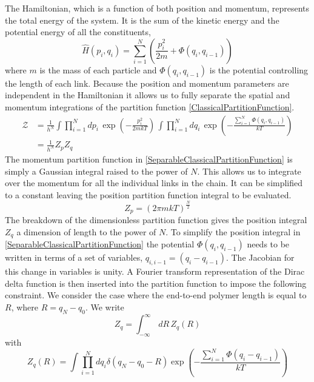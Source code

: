 The Hamiltonian, which is a function of both position and momentum, represents the total energy of the system. It is the sum of the kinetic energy and the potential energy of all the constituents,
%
\begin{equation}
\widehat{H}\left(p_{i},q_{i}\right)=\sum_{i=1}^{N}\left(\frac{p_{i}^{2}}{2m}+\Phi\left(q_{i},q_{i-1}\right)\right)\label{Hamiltonian}
\end{equation}
%
where $m$ is the mass of each particle and $\Phi\left(q_{i},q_{i-1}\right)$ is the potential controlling the length of each link. Because the position and momentum parameters are independent in the Hamiltonian it allows us to fully separate the spatial and momentum integrations of the partition function \eqref{ClassicalPartitionFunction}.
%
\begin{align}
\mathcal{Z} & =\frac{1}{h^{N}}\int\prod_{i=1}^{N}dp_{i}\,\exp\left(-\frac{p_{i}^{2}}{2mkT}\right)\,\int\prod_{i=1}^{N}dq_{i}\,\exp\left(-\frac{\sum_{i=1}^{N}\Phi\left(q_{i},q_{i-1}\right)}{kT}\right)\nonumber\\
 & =\frac{1}{h^{N}}Z_{p}Z_{q}\label{SeparableClassicalPartitionFunction}
\end{align}
%
The momentum partition function in \eqref{SeparableClassicalPartitionFunction} is simply a Gaussian integral raised to the power of $N$. This allows us to integrate over the momentum for all the individual links in the chain. It can be simplified to a constant leaving the position partition function integral to be evaluated. 
%
\begin{equation}
Z_{p}=\left(2\pi mkT\right)^{\frac{N}{2}}\label{MomentumPartitionFunction}
\end{equation}
%
The breakdown of the dimensionless partition function gives the position integral $Z_{q}$ a dimension of length to the power of $N$. To simplify the position integral in \eqref{SeparableClassicalPartitionFunction} the potential $\Phi\left(q_{i},q_{i-1}\right)$ needs to be written in terms of a set of variables, $q_{i,i-1}=\left(q_{i}-q_{i-1}\right)$. The Jacobian for this change in variables is unity. A Fourier transform representation of the Dirac delta function is then inserted into the partition function to impose the following constraint. We consider the case where the end-to-end polymer length is equal to $R$, where $R=q_{N}-q_{0}$. We write 
%
\begin{equation}
Z_{q}=\int^{\infty}_{-\infty} \, dR\, Z_{q}\left(R\right)
\end{equation}
%
with
%
\begin{equation}
Z_{q}\left(R\right) = \int\prod_{i=1}^{N}dq_{i} \delta\left(q_{N}-q_{0}-R\right) \exp\left(-\frac{\sum_{i=1}^{N}\Phi\left(q_{i}-q_{i-1} \right)}{kT}\right)
\end{equation}
